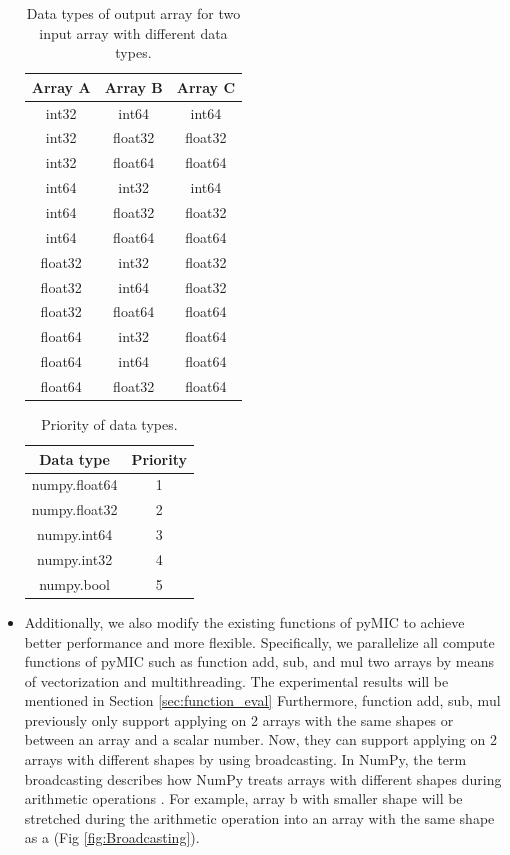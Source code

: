 \begin{itemize}
\begin{table}
\centering
\caption{Data types of output array for two input array with different data types.}
\label{table : Convert Rule}
 \begin{tabular}{ |c|c|c|  }
\hline
\textbf{Array A} & \textbf{Array B} &  \textbf{Array C}\\
\hline

int32	&	int64	&	int64 \\
int32	&	float32	&	float32\\
int32	&	float64	&	float64\\
\hline
int64	&	int32	&	int64	\\
int64	&	float32	&	float32\\
int64	&	float64	&	float64\\
\hline
float32	&	int32	&	float32\\
float32	&	int64	&	float32\\
float32	&	float64	&	float64	\\
\hline
float64	&	int32	&	float64\\
float64	&	int64	&	float64\\
float64	&	float32	&	float64\\
\hline
\end{tabular}
\end{table}

\begin{table}
\centering
\caption{Priority of data types.}
\label{table : Data Type Rank}
\begin{tabular}{ |c|c|  }
\hline
\textbf{Data type} & \textbf{Priority} \\
\hline
numpy.float64 & 1\\
numpy.float32 & 2 \\
numpy.int64 & 3 \\
numpy.int32 & 4\\
numpy.bool & 5\\

\hline
\end{tabular}
\end{table}

\item Additionally, we also modify the existing functions of pyMIC to achieve better performance and more flexible. Specifically, we parallelize all compute functions of pyMIC such as function add, sub, and mul two arrays by means of vectorization and multithreading. The experimental results will be mentioned in Section \ref{sec:function_eval} Furthermore, function add, sub, mul previously only support applying on 2 arrays with the same shapes or between an array and a scalar number. Now, they can support applying on 2 arrays with different shapes by using broadcasting. In NumPy, the term broadcasting describes how NumPy treats arrays with different shapes during arithmetic operations \cite{Broadcast}. For example, array b with smaller shape will be stretched during the arithmetic operation into an array with the same shape as a (Fig \ref{fig:Broadcasting}). 


\end{itemize}
